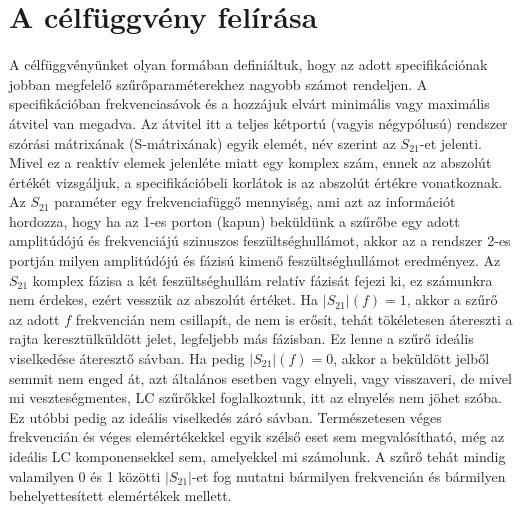 \section{A célfüggvény felírása}
    A célfüggvényünket olyan formában definiáltuk, hogy az adott specifikációnak jobban megfelelő szűrőparaméterekhez nagyobb számot rendeljen. A specifikációban frekvenciasávok és a hozzájuk elvárt minimális vagy maximális átvitel van megadva. Az átvitel itt a teljes kétportú (vagyis négypólusú) rendszer szórási mátrixának (S-mátrixának) egyik elemét, név szerint az $S_{21}$-et jelenti. Mivel ez a reaktív elemek jelenléte miatt egy komplex szám, ennek az abszolút értékét vizsgáljuk, a specifikációbeli korlátok is az abszolút értékre vonatkoznak. Az $S_{21}$ paraméter egy frekvenciafüggő mennyiség, ami azt az információt hordozza, hogy ha az 1-es porton (kapun) beküldünk a szűrőbe egy adott amplitúdójú és frekvenciájú szinuszos feszültséghullámot, akkor az a rendszer 2-es portján milyen amplitúdójú és fázisú kimenő feszültséghullámot eredményez. Az $S_{21}$ komplex fázisa a két feszültséghullám relatív fázisát fejezi ki, ez számunkra nem érdekes, ezért vesszük az abszolút értéket. Ha $|S_{21}|(f) = 1$, akkor a szűrő az adott $f$ frekvencián nem csillapít, de nem is erősít, tehát tökéletesen átereszti a rajta keresztülküldött jelet, legfeljebb más fázisban. Ez lenne a szűrő ideális viselkedése áteresztő sávban. Ha pedig $|S_{21}|(f) = 0$, akkor a beküldött jelből semmit nem enged át, azt általános esetben vagy elnyeli, vagy visszaveri, de mivel mi veszteségmentes, LC szűrőkkel foglalkoztunk, itt az elnyelés nem jöhet szóba. Ez utóbbi pedig az ideális viselkedés záró sávban. Természetesen véges frekvencián és véges elemértékekkel egyik szélső eset sem megvalósítható, még az ideális LC komponensekkel sem, amelyekkel mi számolunk. A szűrő tehát mindig valamilyen 0 és 1 közötti $|S_{21}|$-et fog mutatni bármilyen frekvencián és bármilyen behelyettesített elemértékek mellett.

